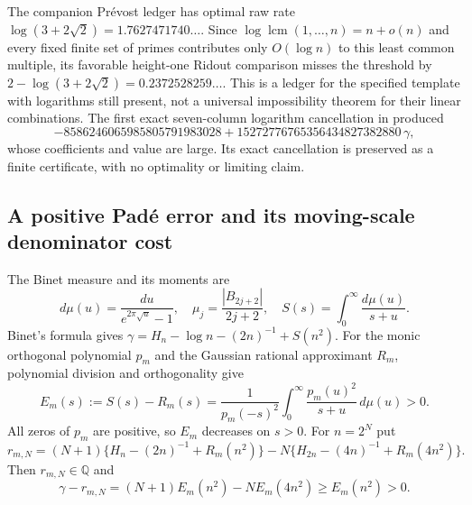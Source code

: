 \documentclass[11pt,a4paper]{article}
\newcommand{\Q}{\mathbb Q}
\theoremstyle{definition}
\theoremstyle{remark}
\numberwithin{equation}{section}
\begin{document}
The companion Pr\'evost ledger has optimal raw rate
$\log(3+2\sqrt2)=1.7627471740\ldots$.  Since
$\log\operatorname{lcm}(1,\ldots,n)=n+o(n)$ and every fixed finite set
of primes contributes only $O(\log n)$ to this least common multiple,
its favorable height-one Ridout comparison misses the threshold by
$2-\log(3+2\sqrt2)=0.2372528259\ldots$.  This is a ledger for the
specified template with logarithms still present, not a universal
impossibility theorem for their linear combinations.  The first exact
seven-column logarithm cancellation in \cite{fd:early} produced
\[
 -8586246065985805791983028
 +15272776765356434827382880\,\gamma,
\]
whose coefficients and value are large.  Its exact cancellation is
preserved as a finite certificate, with no optimality or limiting claim.

\subsection{A positive Pad\'e error and its moving-scale denominator cost}
The Binet measure and its moments are
\begin{equation}\label{fd:eq:binetmeasure}
 d\mu(u)=\frac{du}{e^{2\pi\sqrt u}-1},\quad
 \mu_j=\frac{|B_{2j+2}|}{2j+2},\quad
 S(s)=\int_0^\infty\frac{d\mu(u)}{s+u}.
\end{equation}
Binet's formula \cite[\S5.9]{fd:DLMF} gives
$\gamma=H_n-\log n-(2n)^{-1}+S(n^2)$.
For the monic orthogonal polynomial $p_m$ and the Gaussian rational
approximant $R_m$, polynomial division and orthogonality give
\begin{equation}\label{fd:eq:padeerror}
 E_m(s):=S(s)-R_m(s)
 =\frac1{p_m(-s)^2}\int_0^\infty\frac{p_m(u)^2}{s+u}\,d\mu(u)>0.
\end{equation}
All zeros of $p_m$ are positive, so $E_m$ decreases on $s>0$.
For $n=2^N$ put
\[
 r_{m,N}=(N+1)\{H_n-(2n)^{-1}+R_m(n^2)\}
 -N\{H_{2n}-(4n)^{-1}+R_m(4n^2)\}.
\]
Then $r_{m,N}\in\Q$ and
\[
 \gamma-r_{m,N}=(N+1)E_m(n^2)-NE_m(4n^2)\ge E_m(n^2)>0.
\]
\end{document}
